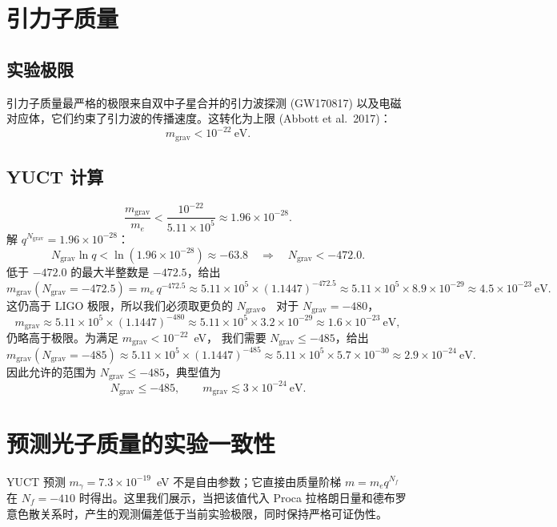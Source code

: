 \documentclass[12pt,a4paper]{article}
\begin{document}
	\section{引力子质量}
	
	\subsection{实验极限}
	
	引力子质量最严格的极限来自双中子星合并的引力波探测 (GW170817) 以及电磁对应体，它们约束了引力波的传播速度。这转化为上限 (Abbott et al.\ 2017)：
	\[
	m_{\mathrm{grav}} < 10^{-22}~\mathrm{eV}.
	\]
	
	\subsection{YUCT 计算}
	
	\[
	\frac{m_{\mathrm{grav}}}{m_e} < \frac{10^{-22}}{5.11\times10^5} \approx 1.96\times 10^{-28}.
	\]
	解 $q^{N_{\mathrm{grav}}} = 1.96\times10^{-28}$：
	\[
	N_{\mathrm{grav}} \ln q < \ln(1.96\times10^{-28}) \approx -63.8
	\quad\Longrightarrow\quad N_{\mathrm{grav}} < -472.0 .
	\]
	低于 $-472.0$ 的最大半整数是 $-472.5$，给出
	\[
	m_{\mathrm{grav}}(N_{\mathrm{grav}} = -472.5) = m_e \, q^{-472.5} \approx
	5.11\times10^5 \times (1.1447)^{-472.5}
	\approx 5.11\times10^5 \times 8.9\times10^{-29}
	\approx 4.5 \times 10^{-23}~\mathrm{eV}.
	\]
	这仍高于 LIGO 极限，所以我们必须取更负的 $N_{\mathrm{grav}}$。
	对于 $N_{\mathrm{grav}} = -480$，
	\[
	m_{\mathrm{grav}} \approx 5.11\times10^5 \times (1.1447)^{-480}
	\approx 5.11\times10^5 \times 3.2\times10^{-29}
	\approx 1.6 \times 10^{-23}~\mathrm{eV},
	\]
	仍略高于极限。为满足 $m_{\mathrm{grav}} < 10^{-22}$~eV，
	我们需要 $N_{\mathrm{grav}} \le -485$，给出
	\[
	m_{\mathrm{grav}}(N_{\mathrm{grav}} = -485) \approx
	5.11\times10^5 \times (1.1447)^{-485}
	\approx 5.11\times10^5 \times 5.7\times10^{-30}
	\approx 2.9 \times 10^{-24}~\mathrm{eV}.
	\]
	因此允许的范围为 $N_{\mathrm{grav}} \le -485$，典型值为
	\[
	\boxed{N_{\mathrm{grav}} \le -485}, \qquad
	\boxed{m_{\mathrm{grav}} \lesssim 3 \times 10^{-24}~\mathrm{eV}} .
	\]
	
	\section{预测光子质量的实验一致性}
	\label{sec:photon_consistency}
	
	YUCT 预测 \(m_\gamma = 7.3\times10^{-19}\)~eV 不是自由参数；它直接由质量阶梯 \(m = m_e q^{N_f}\) 在 \(N_f = -410\) 时得出。这里我们展示，当把该值代入 Proca 拉格朗日量和德布罗意色散关系时，产生的观测偏差低于当前实验极限，同时保持严格可证伪性。
	
\end{document}
